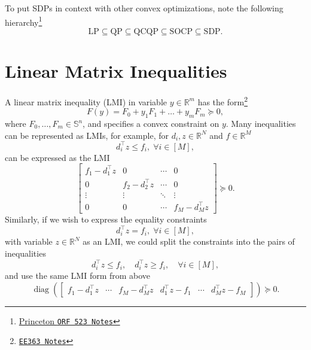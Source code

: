 \documentclass[a4paper]{article}
\DeclareMathOperator{\diag}{diag}
\begin{document}
To put SDPs in context with other convex optimizations, note the following hierarchy\footnote{\href{http://www.princeton.edu/~amirali/Public/Teaching/ORF523/S16/ORF523_S16_Lec9_gh.pdf}{Princeton \texttt{ORF 523 Notes}}}
\begin{equation*}
\text{LP}\subseteq\text{QP}\subseteq\text{QCQP}\subseteq\text{SOCP}\subseteq\text{SDP}.
\end{equation*}

\section*{Linear Matrix Inequalities}
A linear matrix inequality (LMI) in variable $y\in\mathbb{R}^m$ has the form\footnote{\href{https://stanford.edu/class/ee363/sessions/s4notes.pdf}{\texttt{EE363 Notes}}}
\begin{equation}
F(y) = F_0 + y_1F_1 + \dots + y_mF_m \succeq 0,
\end{equation}
where $F_0,\dots,F_m\in\mathbb{S}^n$, and specifies a convex constraint on $y$.
Many inequalities can be represented as LMIs, for example, for $d_i,z\in\mathbb{R}^N$ and $f\in\mathbb{R}^M$
\begin{equation*}
d_i^\top z \le f_i,\;\forall i\in[M],
\end{equation*}
can be expressed as the LMI
\begin{equation*}
\begin{bmatrix}
f_1 - d_1^\top z &       0          & \cdots &    0   \\
      0          & f_2 - d_2^\top z & \cdots &    0   \\
   \vdots        &     \vdots       & \ddots & \vdots \\
      0          &       0          & \cdots & f_M - d_M^\top z
\end{bmatrix} \succeq 0.
\end{equation*}
Similarly, if we wish to express the equality constraints
\begin{equation*}
d_i^\top z = f_i,\;\forall i\in[M],
\end{equation*}
with variable $z\in\mathbb{R}^N$ as an LMI, we could split the constraints into the pairs of inequalities
\begin{equation*}
d_i^\top z \le f_i, \quad d_i^\top z \ge f_i,\quad\forall i\in[M],
\end{equation*}
and use the same LMI form from above
\begin{equation*}
\diag(\begin{bmatrix}f_1-d_1^\top z & \cdots & f_M-d_M^\top z & d_1^\top z - f_1 & \cdots & d_M^\top z - f_M \end{bmatrix}) \succeq 0.
\end{equation*}
\end{document}
